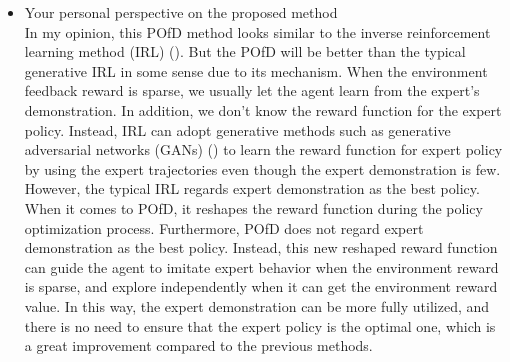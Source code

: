 \begin{itemize}
    \item Your personal perspective on the proposed method \\
    In my opinion, this POfD method looks similar to the inverse reinforcement learning method (IRL) (\cite{fu2017learning}). But the POfD will be better than the typical generative IRL in some sense due to its mechanism. When the environment feedback reward is sparse, we usually let the agent learn from the expert’s demonstration. In addition, we don’t know the reward function for the expert policy. Instead, IRL can adopt generative methods such as generative adversarial networks (GANs) (\cite{goodfellow2014generative}) to learn the reward function for expert policy by using the expert trajectories even though the expert demonstration is few. However, the typical IRL regards expert demonstration as the best policy. When it comes to POfD, it reshapes the reward function during the policy optimization process. Furthermore, POfD does not regard expert demonstration as the best policy. Instead, this new reshaped reward function can guide the agent to imitate expert behavior when the environment reward is sparse, and explore independently when it can get the environment reward value. In this way, the expert demonstration can be more fully utilized, and there is no need to ensure that the expert policy is the optimal one, which is a great improvement compared to the previous methods.
\end{itemize}
